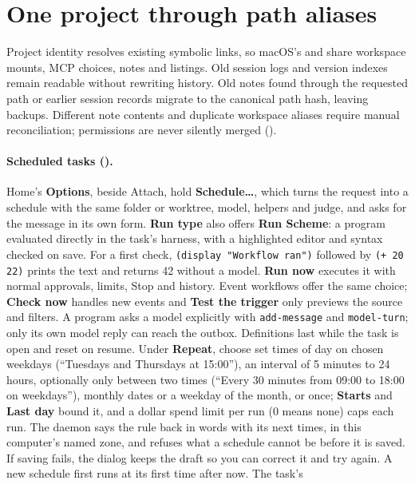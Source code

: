 \section{One project through path aliases}

Project identity resolves existing symbolic links, so macOS's  and
 share workspace mounts, MCP choices, notes and listings.
Old session logs and version indexes remain readable without rewriting history.
Old notes found through the requested path or earlier session records migrate to
the canonical path hash, leaving  backups.
Different note contents and duplicate workspace aliases require manual
reconciliation; permissions are never silently merged ().

\paragraph{Scheduled tasks ().}
Home's \textbf{Options}, beside Attach, hold \textbf{Schedule\ldots}, which turns
the request into a schedule with the same folder or worktree, model, helpers
and judge, and asks for the message in its own form. \textbf{Run type} also
offers \textbf{Run Scheme}: a program evaluated directly in the task's harness,
with a highlighted editor and syntax checked on save. For a first check,
\texttt{(display "Workflow ran")} followed by \texttt{(+ 20 22)} prints the
text and returns 42 without a model. \textbf{Run now} executes it with normal
approvals, limits, Stop and history. Event workflows offer the same choice;
\textbf{Check now} handles new events and \textbf{Test the trigger} only previews
the source and filters. A program asks a model explicitly with
\texttt{add-message} and \texttt{model-turn}; only its own model reply can
reach the outbox. Definitions last while the task is open and reset on resume.
Under
\textbf{Repeat}, choose set times of day on chosen weekdays (``Tuesdays and
Thursdays at 15:00''), an interval of 5 minutes to 24 hours, optionally only
between two times (``Every 30 minutes from 09:00 to 18:00 on weekdays''),
monthly dates or a weekday of the month, or once; \textbf{Starts} and
\textbf{Last day} bound it, and a dollar spend limit per run (0 means none)
caps each run. The daemon says the rule back in words with its next times,
in this computer's named zone, and refuses what a schedule cannot be before it
is saved. If saving fails, the dialog keeps the draft so you can correct it and
try again. A new schedule first runs at its first time after now. The task's
